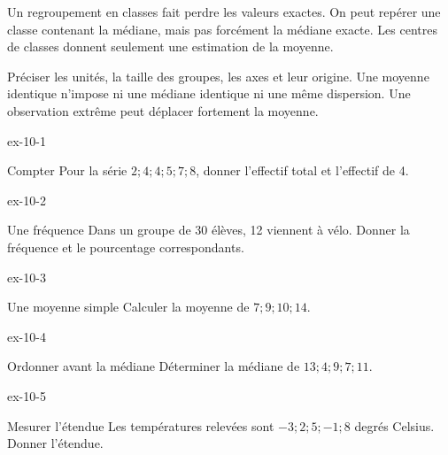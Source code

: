 \begin{attention}Un regroupement en classes fait perdre les valeurs exactes. On peut repérer une classe contenant la médiane, mais pas forcément la médiane exacte. Les centres de classes donnent seulement une estimation de la moyenne.\end{attention}
\begin{savoirfaire}[Comparer]Préciser les unités, la taille des groupes, les axes et leur origine. Une moyenne identique n’impose ni une médiane identique ni une même dispersion. Une observation extrême peut déplacer fortement la moyenne.\end{savoirfaire}
\clearpage{}
\begin{blocLivre}{ex-10-1}\begin{exercice}[1]{Compter}
Pour la série $2;4;4;5;7;8$, donner l’effectif total et l’effectif de 4.
\end{exercice}\end{blocLivre}
\begin{blocLivre}{ex-10-2}\begin{exercice}[1]{Une fréquence}
Dans un groupe de 30 élèves, 12 viennent à vélo. Donner la fréquence et le pourcentage correspondants.
\end{exercice}\end{blocLivre}
\begin{blocLivre}{ex-10-3}\begin{exercice}[1]{Une moyenne simple}
Calculer la moyenne de $7;9;10;14$.
\end{exercice}\end{blocLivre}
\begin{blocLivre}{ex-10-4}\begin{exercice}[1]{Ordonner avant la médiane}
Déterminer la médiane de $13;4;9;7;11$.
\end{exercice}\end{blocLivre}
\begin{blocLivre}{ex-10-5}\begin{exercice}[1]{Mesurer l’étendue}
Les températures relevées sont $-3;2;5;-1;8$ degrés Celsius. Donner l’étendue.
\end{exercice}\end{blocLivre}

